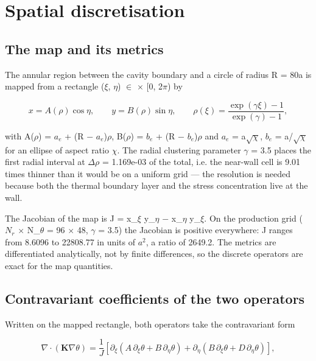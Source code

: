 \documentclass[preprint,12pt]{elsarticle}
\begin{document}
\section{Spatial discretisation}
\label{sec:6}

\subsection{The map and its metrics}
\label{sec:6.1}

The annular region between the cavity boundary and a circle of radius R = 80a is mapped from a rectangle ($\xi$, $\eta$) $\in$ \cite{florence1959} $\times$ [0, 2$\pi$) by

\begin{equation}
x=A(\rho)\cos\eta,\qquad y=B(\rho)\sin\eta,\qquad\rho(\xi)=\frac{\exp(\gamma\xi)-1}{\exp(\gamma)-1}, 
\label{eq:13}
\end{equation}

with A($\rho$) = $a_{e}$ + (R $-$ $a_{e}$)$\rho$, B($\rho$) = $b_{e}$ + (R $-$ $b_{e}$)$\rho$ and $a_{e}$ = a$\sqrt \chi$, $b_{e}$ = a/$\sqrt \chi$ for an ellipse of aspect ratio $\chi$. The radial clustering parameter $\gamma$ = 3.5 places the first radial interval at $\Delta \rho$ = 1.169e-03 of the total, i.e. the near-wall cell is 9.01 times thinner than it would be on a uniform grid --- the resolution is needed because both the thermal boundary layer and the stress concentration live at the wall.

The Jacobian of the map is J = x\_$\xi$ y\_$\eta$ $-$ x\_$\eta$ y\_$\xi$. On the production grid ($N_{r}$ $\times$ N\_$\theta$ = 96 $\times$ 48, $\gamma$ = 3.5) the Jacobian is positive everywhere: J ranges from 8.6096 to 22808.77 in units of $a^{2}$, a ratio of 2649.2. The metrics are differentiated analytically, not by finite differences, so the discrete operators are exact for the map quantities.

\subsection{Contravariant coefficients of the two operators}
\label{sec:6.2}

Written on the mapped rectangle, both operators take the contravariant form

\begin{equation}
\nabla\cdot(\mathbf{K}\nabla\theta)=\frac{1}{J}\left[\partial_\xi\left(A\,\partial_\xi\theta+B\,\partial_\eta\theta\right)+\partial_\eta\left(B\,\partial_\xi\theta+D\,\partial_\eta\theta\right)\right], 
\label{eq:14}
\end{equation}
\end{document}
